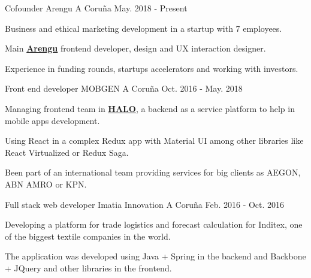 


\begin{cventries}


\cventry
{Cofounder} %
{Arengu} %
{A Coruña} %
{May. 2018 - Present} %
{ %
\begin{cvitems}
\item {Business and ethical marketing development in a startup with 7 employees.}
\item {Main \textbf{\href{https://arengu.com/}{Arengu}} frontend developer, design and UX interaction designer.}
\item {Experience in funding rounds, startups accelerators and working with investors.}
\end{cvitems}
}

\cventry
{Front end developer} %
{MOBGEN} %
{A Coruña} %
{Oct. 2016 - May. 2018} %
{ %
\begin{cvitems}
\item {Managing frontend team in 
\textbf{\href{https://halo.mobgen.com/info/}{HALO}}, a backend as a service
platform to help in mobile apps development.}
\item {Using React in a complex Redux app with Material UI among other 
libraries like React Virtualized or Redux Saga.}
\item {Been part of an international team providing services for big clients as 
AEGON, ABN AMRO or KPN.}
\end{cvitems}
}

\cventry
{Full stack web developer} %
{Imatia Innovation} %
{A Coruña} %
{Feb. 2016 - Oct. 2016} %
{ %
\begin{cvitems}
\item {Developing a platform for trade logistics and forecast 
calculation for Inditex, one of the biggest textile companies in the world.}
\item {The application was developed using Java + Spring in the backend and
Backbone + JQuery and other libraries in the frontend.}
\end{cvitems}
}


\end{cventries}
